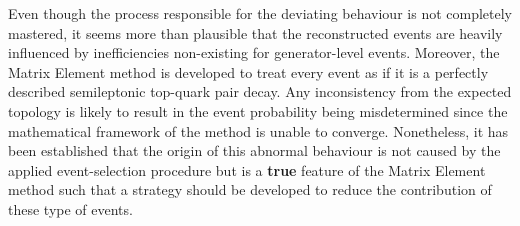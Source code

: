 %

Even though the process responsible for the deviating behaviour is not completely mastered, it seems more than plausible that the reconstructed events are heavily influenced by inefficiencies non-existing for generator-level events. Moreover, the Matrix Element method is developed to treat every event as if it is a perfectly described semileptonic top-quark pair decay. Any inconsistency from the expected topology is likely to result in the event probability being misdetermined since the mathematical framework of the method is unable to converge.
Nonetheless, it has been established that the origin of this abnormal behaviour is not caused by the applied event-selection procedure but is a \textbf{true} feature of the Matrix Element method such that a strategy should be developed to reduce the contribution of these type of events.

